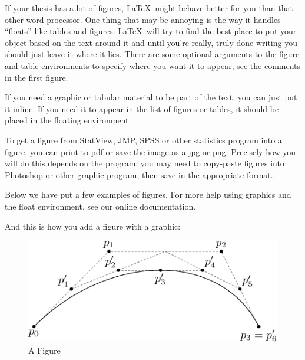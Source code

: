 \documentclass[12pt,twoside]{reedthesis}
\begin{document}
        If your thesis has a lot of figures, \LaTeX\ might behave better for you than that other word processor.  One thing that may be annoying is the way it handles ``floats'' like tables and figures. \LaTeX\ will try to find the best place to put your object based on the text around it and until you're really, truly done writing you should just leave it where it lies.   There are some optional arguments to the figure and table environments to specify where you want it to appear; see the comments in the first figure.

        If you need a graphic or tabular material to be part of the text, you can just put it inline. If you need it to appear in the list of figures or tables, it should be placed in the floating environment.

        To get a figure from StatView, JMP, SPSS or other statistics program into a figure, you can print to pdf or save the image as a jpg or png. Precisely how you will do this depends on the program: you may need to copy-paste figures into Photoshop or other graphic program, then save in the appropriate format.

        Below we have put a few examples of figures. For more help using graphics and the float environment, see our online documentation.

        And this is how you add a figure with a graphic:
        \begin{figure}[h]

               \centering
            \includegraphics{subdivision}
             \caption{A Figure}
         \label{subd}
        \end{figure}

\clearpage %
\end{document}
